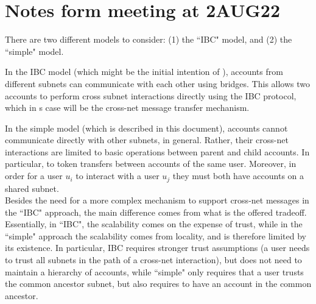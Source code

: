 \section{Notes form meeting at 2AUG22}
\label{sec:meetingNotes}
There are two different models to consider: (1) the ``IBC" model, and (2) the ``simple" model.

In the IBC model \cite{IBC} (which might be the initial intention of \hc), accounts from different subnets can communicate with each other using bridges. This allows two accounts to perform cross subnet interactions directly using the 
IBC protocol, which in \hc s case will be the cross-net message transfer mechanism.

In the simple model (which is described in this document), accounts cannot communicate directly with other subnets, in general. Rather, their cross-net interactions are limited to basic operations between parent and child accounts. In particular, to token transfers between accounts of the same user. Moreover, in order for a user $u_i$ to interact with a user $u_j$ they must both have accounts on a shared subnet.\\

Besides the need for a more complex mechanism to support cross-net messages in the ``IBC" approach, the main difference comes from what is the offered tradeoff.
Essentially, in ``IBC", the scalability comes on the expense of trust, while in the ``simple" approach the scalability comes from locality, and is therefore limited by its existence.
In particular, IBC requires stronger trust assumptions (a user needs to trust all subnets in the path of a cross-net interaction), but does not need to maintain a hierarchy of accounts, while ``simple" only requires that a user trusts the common ancestor subnet, but also requires to have an account in the common ancestor.\\
%
\\
\\


